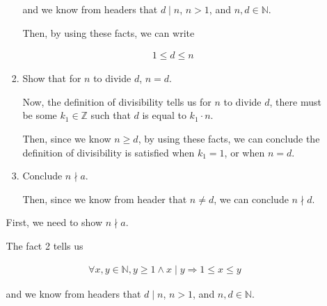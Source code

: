 \documentclass[12pt]{article}
\begin{document}
\begin{enumerate}[a.]
\begin{mdframed}
\begin{enumerate}[1.]
\begin{enumerate}[1.]
\begin{mdframed}
            and we know from headers that $d \mid n$, $n > 1$, and $n,d \in \mathbb{N}$.

            \bigskip

            Then, by using these facts, we can write

            \begin{align}
                1 \leq d \leq n
            \end{align}

            \end{mdframed}

            \item Show that for $n$ to divide $d$, $n = d$.

            \begin{mdframed}
            Now, the definition of divisibility tells us for $n$ to
            divide $d$, there must be some $k_1 \in \mathbb{Z}$ such that
            $d$ is equal to $k_1 \cdot n$.

            \bigskip

            Then, since we know $n \geq d$, by using these facts, we can conclude
            the definition of divisibility is satisfied when $k_1 = 1$, or
            when $n = d$.

            \end{mdframed}

            \item Conclude $n \nmid a$.

            \begin{mdframed}
            Then, since we know from header that $n \neq d$, we can conclude
            $n \nmid d$.
            \end{mdframed}
        \end{enumerate}

        \begin{mdframed}
        First, we need to show $n \nmid a$.

        \bigskip

        The fact 2 tells us

        \begin{align}
            \forall x,y \in \mathbb{N}, y \geq 1 \land x \mid y \Rightarrow 1 \leq x \leq y
        \end{align}

        and we know from headers that $d \mid n$, $n > 1$, and $n,d \in \mathbb{N}$.

        \bigskip


\end{mdframed}
\end{enumerate}
\end{mdframed}
\end{enumerate}
\end{document}
